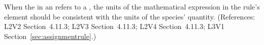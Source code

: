 When the  in an \AssignmentRule refers to a \Species, the
units of the mathematical expression in the rule's  element
should be consistent with the units of the species' quantity.  (References:
L2V2 Section~4.11.3; L2V3 Section~4.11.3; L2V4 Section~4.11.3; L3V1
Section~\ref{sec:assignmentrule}.)
